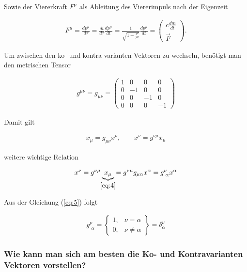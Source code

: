 Sowie der Viererkraft \(F^\mu\) als Ableitung des Viererimpuls nach der Eigenzeit

\begin{align}
  \label{eq:10}
  F^\mu = \frac{dp^\mu}{d\tau} = \frac{dt}{d\tau}\frac{dp^\mu}{dt} = \frac{1}{\sqrt{1-\frac{v^2}{c^2}}}\frac{dp^\mu}{dt} = \begin{pmatrix}c \frac{dm}{dt}\\\vec F \end{pmatrix}.
\end{align}


Um zwischen den ko- und kontra-varianten Vektoren zu wechseln, benötigt man den metrischen Tensor

\begin{align}
  \label{eq:3}
  g^{\mu\nu} = g_{\mu\nu} = \begin{pmatrix} 1&0&0&0 \\  0&-1&0&0 \\ 0&0&-1&0 \\ 0&0&0&-1  \end{pmatrix}
\end{align}


Damit gilt

\begin{align}
  \label{eq:4}
  x_{\mu} = g_{\mu\nu}x^\nu, \qquad x^\nu = g^{\nu\mu}x_\mu
\end{align}

weitere wichtige Relation

\begin{align}
  \label{eq:5}
  x^\nu = g^{\nu\mu}\underbr{x_\mu}_{\eqref{eq:4}} = g^{\nu\mu}  g_{\mu\alpha}x^\alpha = g^\nu_{\,\,\alpha}x^{\alpha}
\end{align}

Aus der Gleichung (\ref{eq:5}) folgt

\begin{align}
  \label{eq:6}
  g^\nu_{\,\,\alpha} = \begin{Bmatrix} 1,& \nu = \alpha\\ 0,&\nu\neq\alpha \end{Bmatrix} = \delta^\nu_{\alpha}
\end{align}

\subsubsection*{Wie kann man sich am besten die Ko- und Kontravarianten Vektoren vorstellen?} 

